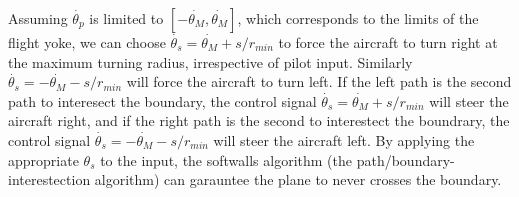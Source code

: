 \documentclass[11pt]{article}
\begin{document}
Assuming $\dot{\theta_{p}}$ is limited to $[-\dot{\theta_{M}},
\dot{\theta_{M}}]$, which corresponds to the limits of the flight
yoke, we can choose $\dot{\theta_{s}} = \dot{\theta_{M}} + s/r_{min}$
to force the aircraft to turn right at the maximum turning radius,
irrespective of pilot input.  Similarly $\dot{\theta_{s}} =
-\dot{\theta_{M}} - s/r_{min}$ will force the aircraft to turn left.
If the left path is the second path to interesect the boundary, the
control signal $\dot{\theta_{s}} = \dot{\theta_{M}} + s/r_{min}$ will
steer the aircraft right, and if the right path is the second to
interestect the boundrary, the control signal $\dot{\theta_{s}} =
-\dot{\theta_{M}} - s/r_{min}$ will steer the aircraft left.  By
applying the appropriate $\theta_{s}$ to the input, the softwalls
algorithm (the path/boundary-interestection algorithm) can garauntee
the plane to never crosses the boundary.
\end{document}
